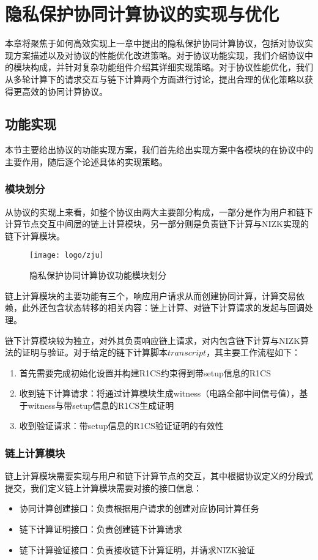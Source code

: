 \chapter{隐私保护协同计算协议的实现与优化}
本章将聚焦于如何高效实现上一章中提出的隐私保护协同计算协议，包括对协议实现方案描述以及对协议的性能优化改进策略。对于协议功能实现，我们介绍协议中的模块构成，并针对复杂功能组件介绍其详细实现策略。对于协议性能优化，我们从多轮计算下的请求交互与链下计算两个方面进行讨论，提出合理的优化策略以获得更高效的协同计算协议。
\section{功能实现}
本节主要给出协议的功能实现方案，我们首先给出实现方案中各模块的在协议中的主要作用，随后逐个论述具体的实现策略。
\subsection{模块划分}
从协议的实现上来看，如整个协议由两大主要部分构成，一部分是作为用户和链下计算节点交互中间层的链上计算模块，另一部分则是负责链下计算与NIZK实现的链下计算模块。

\begin{figure}[htbp]
    \centering
    \texttt{[image: logo/zju]}
    \caption{\label{fig:ch5-structure}隐私保护协同计算协议功能模块划分}
\end{figure}

链上计算模块的主要功能有三个，响应用户请求从而创建协同计算，计算交易依赖，此外还包含状态转移的相关内容：链上计算、对链下计算请求的发起与回调处理。

链下计算模块较为独立，对外其负责响应链上请求，对内包含链下计算与NIZK算法的证明与验证。对于给定的链下计算脚本$transcript$，其主要工作流程如下：
\begin{enumerate}
    \setlength{\itemsep}{0pt}
    \setlength{\parsep}{0pt}
    \setlength{\parskip}{0pt}
    \item 首先需要完成初始化设置并构建R1CS约束得到带setup信息的R1CS
    \item 收到链下计算请求：将通过计算模块生成witness（电路全部中间信号值），基于witness与带setup信息的R1CS生成证明
    \item 收到验证请求：带setup信息的R1CS验证证明的有效性
\end{enumerate}
\subsection{链上计算模块}%
链上计算模块需要实现与用户和链下计算节点的交互，其中根据协议定义的分段式提交，我们定义链上计算模块需要对接的接口信息：
\begin{itemize}
    \setlength{\itemsep}{0pt}
    \setlength{\parsep}{0pt}
    \setlength{\parskip}{0pt}
    \item 协同计算创建接口：负责根据用户请求的创建对应协同计算任务
    \item 链下计算证明接口：负责创建链下计算请求
    \item 链下计算验证接口：负责接收链下计算证明，并请求NIZK验证
\end{itemize}

